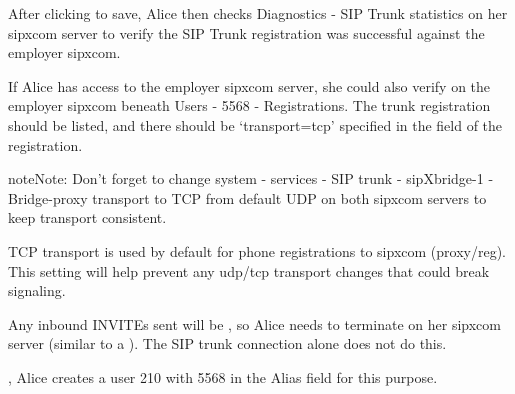 \documentclass[letterpaper,10pt,english]{sphinxmanual}
\begin{document}

After clicking  to save, Alice then checks Diagnostics - SIP Trunk statistics on her sipxcom server to verify the SIP Trunk registration was successful against the employer sipxcom.


If Alice has access to the employer sipxcom server, she could also verify on the employer sipxcom beneath Users - 5568 - Registrations.
The trunk registration should be listed, and there should be ‘transport=tcp’ specified in the  field of the registration.


\begin{sphinxadmonition}{note}{Note:}
Don’t forget to change system - services - SIP trunk - sipXbridge-1 - Bridge-proxy transport to TCP from default UDP on both sipxcom servers to keep transport consistent.


TCP transport is used by default for phone registrations to sipxcom (proxy/reg). This setting will help prevent any udp/tcp transport changes that could break signaling.
\end{sphinxadmonition}

Any inbound INVITEs sent  will be , so Alice needs to terminate  on her sipxcom server (similar to a {\hyperref[\detokenize{webui:alias-field}]{}}).
The SIP trunk connection alone does not do this.

, Alice creates a  user 210 with 5568 in the Alias field for this purpose.

\end{document}
